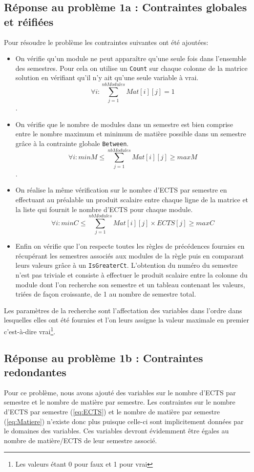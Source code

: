 \documentclass[a4paper, 11pt]{article}
\begin{document}
\subsection{Réponse au problème 1a : Contraintes globales et réifiées}\label{sec:1a}
Pour résoudre le problème les contraintes suivantes ont été ajoutées:
\begin{itemize}
\item On vérifie qu'un module ne peut apparaître qu'une seule fois dans l'ensemble des semestres. Pour cela on utilise un \verb+Count+ sur chaque colonne de la matrice solution en vérifiant qu'il n'y ait qu'une seule variable à vrai. \begin{equation}  \forall i: \sum_{j=1}^{nbModules}Mat[i][j] = 1 \end{equation}.
\item On vérifie que le nombre de modules dans un semestre est bien comprise entre le nombre maximum et minimum de matière possible dans un semestre grâce à la contrainte globale \verb+Between+.\begin{equation}\label{eq:Matiere}\forall{i}:  minM \leq \sum_{j=1}^{nbModules}Mat[i][j] \geq maxM\end{equation}.
\item On réalise la même vérification sur le nombre d'ECTS par semestre en effectuant au préalable un produit scalaire entre chaque ligne de la matrice et la liste qui fournit le nombre d'ECTS pour chaque module.\begin{equation}\label{eq:ECTS}\forall{i}:  minC \leq \sum_{j=1}^{nbModules} {{Mat[i][j]} \times ECTS[j]} \geq maxC\end{equation}
\item Enfin on vérifie que l'on respecte toutes les règles de précédences fournies en récupérant les semestres associés aux modules de la règle puis en comparant leurs valeurs grâce à un \verb+IsGreaterCt+. L'obtention du numéro du semestre n'est pas triviale et consiste à effectuer le produit scalaire entre la colonne du module dont l'on recherche son semestre et un tableau contenant les valeurs, triées de façon croissante, de 1 au nombre de semestre total.
\end{itemize}

Les paramètres de la recherche sont l'affectation des variables dans l'ordre dans lesquelles elles ont été fournies et l'on leurs assigne la valeur maximale en premier c'est-à-dire vrai\footnote{Les valeurs étant 0 pour faux et 1 pour vrai}.

\subsection{Réponse au problème 1b : Contraintes redondantes}\label{sec:1b}
Pour ce problème, nous avons ajouté des variables sur le nombre d'ECTS par semestre et le nombre de matière par semestre.
Les contraintes sur le nombre d'ECTS par semestre (\ref{eq:ECTS}) et le nombre de matière par semestre (\ref{eq:Matiere}) n'existe donc plus puisque celle-ci sont implicitement données par le domaines des variables. Ces variables devront évidemment être égales au nombre de matière/ECTS de leur semestre associé.
\end{document}

